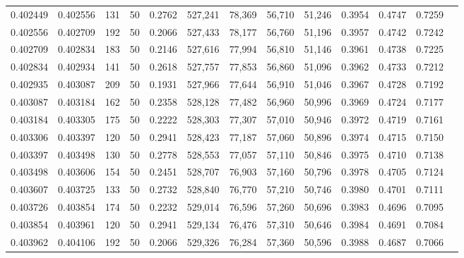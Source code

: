 \begin{tabular}{rrrrrrrrrrrrr}
0.402449 & 0.402556 &   131 &  50 &                                     0.2762 & 527,241 &  78,369 &  56,710 &  51,246 & 0.3954 & 0.4747 & 0.7259 \\
0.402556 & 0.402709 &   192 &  50 &                                     0.2066 & 527,433 &  78,177 &  56,760 &  51,196 & 0.3957 & 0.4742 & 0.7242 \\
0.402709 & 0.402834 &   183 &  50 &                                     0.2146 & 527,616 &  77,994 &  56,810 &  51,146 & 0.3961 & 0.4738 & 0.7225 \\
0.402834 & 0.402934 &   141 &  50 &                                     0.2618 & 527,757 &  77,853 &  56,860 &  51,096 & 0.3962 & 0.4733 & 0.7212 \\
0.402935 & 0.403087 &   209 &  50 &                                     0.1931 & 527,966 &  77,644 &  56,910 &  51,046 & 0.3967 & 0.4728 & 0.7192 \\
0.403087 & 0.403184 &   162 &  50 &                                     0.2358 & 528,128 &  77,482 &  56,960 &  50,996 & 0.3969 & 0.4724 & 0.7177 \\
0.403184 & 0.403305 &   175 &  50 &                                     0.2222 & 528,303 &  77,307 &  57,010 &  50,946 & 0.3972 & 0.4719 & 0.7161 \\
0.403306 & 0.403397 &   120 &  50 &                                     0.2941 & 528,423 &  77,187 &  57,060 &  50,896 & 0.3974 & 0.4715 & 0.7150 \\
0.403397 & 0.403498 &   130 &  50 &                                     0.2778 & 528,553 &  77,057 &  57,110 &  50,846 & 0.3975 & 0.4710 & 0.7138 \\
0.403498 & 0.403606 &   154 &  50 &                                     0.2451 & 528,707 &  76,903 &  57,160 &  50,796 & 0.3978 & 0.4705 & 0.7124 \\
0.403607 & 0.403725 &   133 &  50 &                                     0.2732 & 528,840 &  76,770 &  57,210 &  50,746 & 0.3980 & 0.4701 & 0.7111 \\
0.403726 & 0.403854 &   174 &  50 &                                     0.2232 & 529,014 &  76,596 &  57,260 &  50,696 & 0.3983 & 0.4696 & 0.7095 \\
0.403854 & 0.403961 &   120 &  50 &                                     0.2941 & 529,134 &  76,476 &  57,310 &  50,646 & 0.3984 & 0.4691 & 0.7084 \\
0.403962 & 0.404106 &   192 &  50 &                                     0.2066 & 529,326 &  76,284 &  57,360 &  50,596 & 0.3988 & 0.4687 & 0.7066 \\

\end{tabular}
